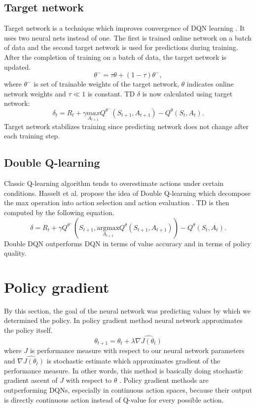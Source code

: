 \subsection{Target network}
Target network is a technique which improves convergence of DQN learning \cite{mnih2015}. It uses two neural nets instead of one. The first is trained online network on a batch of data and the second target network is used for predictions during training. After the completion of training on a batch of data, the target network is updated.
\begin{equation}
\theta^- = \tau \theta + (1-\tau)\theta^-,
\end{equation}
where $\theta^-$ is set of trainable weights of the target network, $\theta$ indicates online network weights and $\tau \ll 1$ is constant.
TD $\delta$ is now calculated using target network:
\begin{equation}
\delta_t = R_{t} + \gamma \underset{A_{t+1}}{max}Q^{\theta^-}(S_{t+1}, A_{t+1}) - Q^\theta(S_t, A_t). 
\end{equation}
Target network stabilizes training since predicting network does not change after each training step.

\subsection{Double Q-learning}
Classic Q-learning algorithm tends to overestimate actions under certain conditions. Hasselt et al. propose the idea of Double Q-learning which decompose the max operation into action selection and action evaluation \cite{hasselt2015}. TD is then computed by the following equation.
\begin{equation}
\delta = R_{t} + \gamma Q^{\theta^-}(S_{t+1}, \underset{A_{t+1}}{\text{argmax}}Q^\theta(S_{t+1}, A_{t+1})) - Q^\theta (S_t, A_t).
\end{equation}
Double DQN outperforms DQN in terms of value accuracy and in terms of policy quality.

\clearpage
\section{Policy gradient}
By this section, the goal of the neural network was predicting values by which we determined the policy. In policy gradient method neural network approximates the policy itself. 
\begin{equation}
\theta_{t+1} = \theta_t + \lambda \widehat{\nabla J(\theta_t)}
\end{equation}
where $J$ is performance measure with respect to our neural network parameters and $\widehat{\nabla J(\theta_t)}$ is stochastic estimate which approximates gradient of the performance measure. In other words, this method is basically doing stochastic gradient ascent of $J$ with respect to $\theta$ \cite{sutton1999}. Policy gradient methods are outperforming DQNs, especially in continuous action spaces, because their output is directly continuous action instead of Q-value for every possible action.

